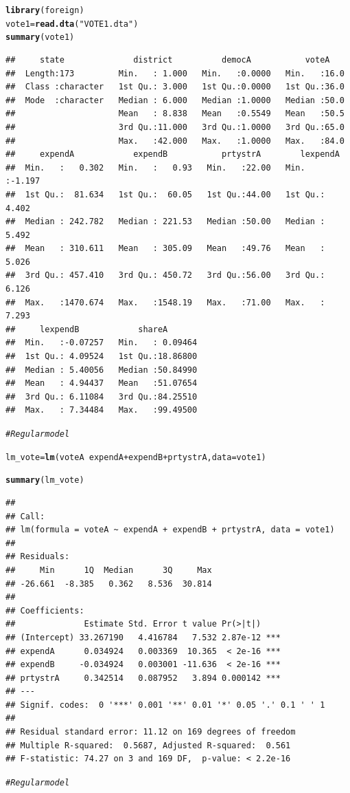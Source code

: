 \documentclass[12pt]{article}\usepackage[]{graphicx}\usepackage[]{color}
\makeatletter
\newcommand{\hlstr}[1]{\textcolor[rgb]{0.192,0.494,0.8}{#1}}%
\newcommand{\hlcom}[1]{\textcolor[rgb]{0.678,0.584,0.686}{\textit{#1}}}%
\newcommand{\hlopt}[1]{\textcolor[rgb]{0,0,0}{#1}}%
\newcommand{\hlstd}[1]{\textcolor[rgb]{0.345,0.345,0.345}{#1}}%
\newcommand{\hlkwb}[1]{\textcolor[rgb]{0.69,0.353,0.396}{#1}}%
\newcommand{\hlkwc}[1]{\textcolor[rgb]{0.333,0.667,0.333}{#1}}%
\newcommand{\hlkwd}[1]{\textcolor[rgb]{0.737,0.353,0.396}{\textbf{#1}}}%
\newenvironment{kframe}{%
 \def\at@end@of@kframe{}%
 \ifinner\ifhmode%
  \def\at@end@of@kframe{\end{minipage}}%
  \begin{minipage}{\columnwidth}%
 \fi\fi%
 \def\FrameCommand##1{\hskip\@totalleftmargin \hskip-\fboxsep
 \colorbox{shadecolor}{##1}\hskip-\fboxsep
     \hskip-\linewidth \hskip-\@totalleftmargin \hskip\columnwidth}%
 \MakeFramed {\advance\hsize-\width
   \@totalleftmargin\z@ \linewidth\hsize
   \@setminipage}}%
 {\par\unskip\endMakeFramed%
 \at@end@of@kframe}
\newenvironment{knitrout}{}{} %
\makeatother
\begin{document}
\begin{knitrout}
\color{fgcolor}\begin{kframe}
\begin{alltt}
\hlkwd{library}\hlstd{(foreign)}
\hlstd{vote1} \hlkwb{=} \hlkwd{read.dta}\hlstd{(}\hlstr{"VOTE1.dta"}\hlstd{)}
\hlkwd{summary}\hlstd{(vote1)}
\end{alltt}
\begin{verbatim}
##     state              district          democA           voteA     
##  Length:173         Min.   : 1.000   Min.   :0.0000   Min.   :16.0  
##  Class :character   1st Qu.: 3.000   1st Qu.:0.0000   1st Qu.:36.0  
##  Mode  :character   Median : 6.000   Median :1.0000   Median :50.0  
##                     Mean   : 8.838   Mean   :0.5549   Mean   :50.5  
##                     3rd Qu.:11.000   3rd Qu.:1.0000   3rd Qu.:65.0  
##                     Max.   :42.000   Max.   :1.0000   Max.   :84.0  
##     expendA            expendB           prtystrA        lexpendA     
##  Min.   :   0.302   Min.   :   0.93   Min.   :22.00   Min.   :-1.197  
##  1st Qu.:  81.634   1st Qu.:  60.05   1st Qu.:44.00   1st Qu.: 4.402  
##  Median : 242.782   Median : 221.53   Median :50.00   Median : 5.492  
##  Mean   : 310.611   Mean   : 305.09   Mean   :49.76   Mean   : 5.026  
##  3rd Qu.: 457.410   3rd Qu.: 450.72   3rd Qu.:56.00   3rd Qu.: 6.126  
##  Max.   :1470.674   Max.   :1548.19   Max.   :71.00   Max.   : 7.293  
##     lexpendB            shareA        
##  Min.   :-0.07257   Min.   : 0.09464  
##  1st Qu.: 4.09524   1st Qu.:18.86800  
##  Median : 5.40056   Median :50.84990  
##  Mean   : 4.94437   Mean   :51.07654  
##  3rd Qu.: 6.11084   3rd Qu.:84.25510  
##  Max.   : 7.34484   Max.   :99.49500
\end{verbatim}
\begin{alltt}
\hlcom{# Regular model}

\hlstd{lm_vote} \hlkwb{=} \hlkwd{lm}\hlstd{(voteA} \hlopt{~} \hlstd{expendA} \hlopt{+} \hlstd{expendB} \hlopt{+} \hlstd{prtystrA,} \hlkwc{data} \hlstd{= vote1)}

\hlkwd{summary}\hlstd{(lm_vote)}
\end{alltt}
\begin{verbatim}
## 
## Call:
## lm(formula = voteA ~ expendA + expendB + prtystrA, data = vote1)
## 
## Residuals:
##     Min      1Q  Median      3Q     Max 
## -26.661  -8.385   0.362   8.536  30.814 
## 
## Coefficients:
##              Estimate Std. Error t value Pr(>|t|)    
## (Intercept) 33.267190   4.416784   7.532 2.87e-12 ***
## expendA      0.034924   0.003369  10.365  < 2e-16 ***
## expendB     -0.034924   0.003001 -11.636  < 2e-16 ***
## prtystrA     0.342514   0.087952   3.894 0.000142 ***
## ---
## Signif. codes:  0 '***' 0.001 '**' 0.01 '*' 0.05 '.' 0.1 ' ' 1
## 
## Residual standard error: 11.12 on 169 degrees of freedom
## Multiple R-squared:  0.5687,	Adjusted R-squared:  0.561 
## F-statistic: 74.27 on 3 and 169 DF,  p-value: < 2.2e-16
\end{verbatim}
\begin{alltt}
\hlcom{# Regular model}


\end{alltt}
\end{kframe}
\end{knitrout}
\end{document}
